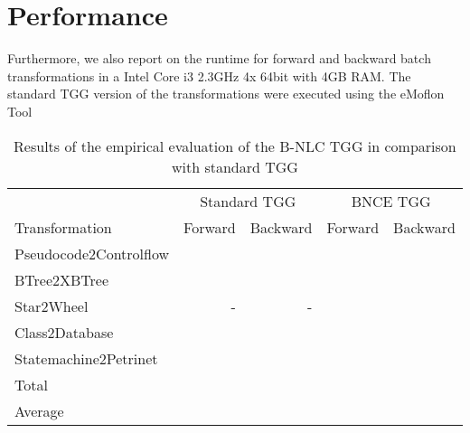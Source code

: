

\section{Performance}
Furthermore, we also report on the runtime for forward and backward batch transformations in a Intel Core i3 2.3GHz 4x 64bit with 4GB RAM. The standard TGG version of the transformations were executed using the eMoflon Tool %
\begin{table}[h]
	\centering
	\begin{tabular}{l r r r r }
		\hline
			& \multicolumn{2}{c}{Standard TGG} & \multicolumn{2}{c}{BNCE TGG}\\
		Transformation 	& Forward & Backward & Forward & Backward \\
		\hline
		Pseudocode2Controlflow	& 		& 		& 	 	&  \\
		BTree2XBTree			&  		& 		& 		&  \\
		Star2Wheel				& -		& -		& 	 	&  \\
		Class2Database			& 		& 		&  		&   \\
		Statemachine2Petrinet	& 		& 		& 		&  \\
		\hline
		Total					&  & 		&	& \\
		Average					&  & 		&	& \\
		\hline
	\end{tabular}
	\caption{Results of the empirical evaluation of the B-NLC TGG in comparison with standard TGG}
	\label{tab:evaluation}
\end{table}